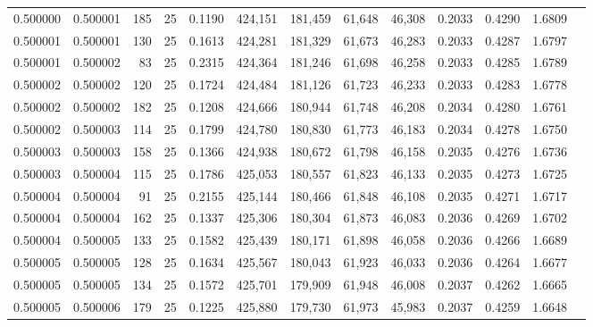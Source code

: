 \begin{tabular}{rrrrrrrrrrrrr}
0.500000 & 0.500001 & 185 &  25 &                                     0.1190 & 424,151 & 181,459 &  61,648 &  46,308 & 0.2033 & 0.4290 & 1.6809 \\
0.500001 & 0.500001 & 130 &  25 &                                     0.1613 & 424,281 & 181,329 &  61,673 &  46,283 & 0.2033 & 0.4287 & 1.6797 \\
0.500001 & 0.500002 &  83 &  25 &                                     0.2315 & 424,364 & 181,246 &  61,698 &  46,258 & 0.2033 & 0.4285 & 1.6789 \\
0.500002 & 0.500002 & 120 &  25 &                                     0.1724 & 424,484 & 181,126 &  61,723 &  46,233 & 0.2033 & 0.4283 & 1.6778 \\
0.500002 & 0.500002 & 182 &  25 &                                     0.1208 & 424,666 & 180,944 &  61,748 &  46,208 & 0.2034 & 0.4280 & 1.6761 \\
0.500002 & 0.500003 & 114 &  25 &                                     0.1799 & 424,780 & 180,830 &  61,773 &  46,183 & 0.2034 & 0.4278 & 1.6750 \\
0.500003 & 0.500003 & 158 &  25 &                                     0.1366 & 424,938 & 180,672 &  61,798 &  46,158 & 0.2035 & 0.4276 & 1.6736 \\
0.500003 & 0.500004 & 115 &  25 &                                     0.1786 & 425,053 & 180,557 &  61,823 &  46,133 & 0.2035 & 0.4273 & 1.6725 \\
0.500004 & 0.500004 &  91 &  25 &                                     0.2155 & 425,144 & 180,466 &  61,848 &  46,108 & 0.2035 & 0.4271 & 1.6717 \\
0.500004 & 0.500004 & 162 &  25 &                                     0.1337 & 425,306 & 180,304 &  61,873 &  46,083 & 0.2036 & 0.4269 & 1.6702 \\
0.500004 & 0.500005 & 133 &  25 &                                     0.1582 & 425,439 & 180,171 &  61,898 &  46,058 & 0.2036 & 0.4266 & 1.6689 \\
0.500005 & 0.500005 & 128 &  25 &                                     0.1634 & 425,567 & 180,043 &  61,923 &  46,033 & 0.2036 & 0.4264 & 1.6677 \\
0.500005 & 0.500005 & 134 &  25 &                                     0.1572 & 425,701 & 179,909 &  61,948 &  46,008 & 0.2037 & 0.4262 & 1.6665 \\
0.500005 & 0.500006 & 179 &  25 &                                     0.1225 & 425,880 & 179,730 &  61,973 &  45,983 & 0.2037 & 0.4259 & 1.6648 \\

\end{tabular}
